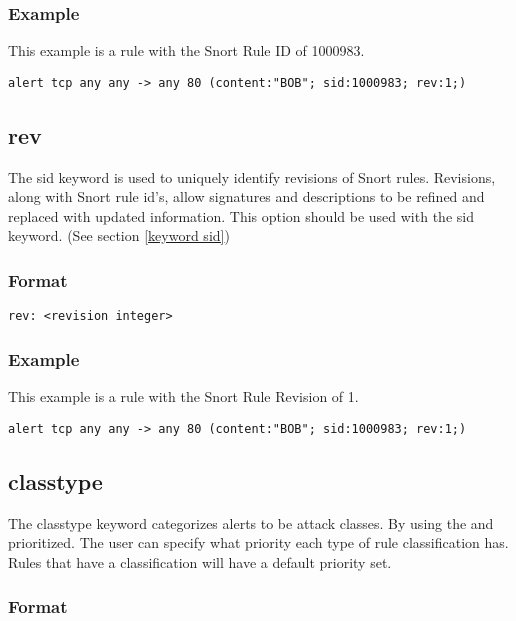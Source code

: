 \documentclass[english]{report}
\begin{document}
\subsubsection{Example}
This example is a rule with the Snort Rule ID of 1000983.
\begin{verbatim}
alert tcp any any -> any 80 (content:"BOB"; sid:1000983; rev:1;)
\end{verbatim}

\subsection{rev \label{keyword rev}}

The sid keyword is used to uniquely identify revisions of Snort rules.
Revisions, along with Snort rule id's, allow signatures and descriptions to be
refined and replaced with updated information.  This option should be used with
the sid keyword.  (See section \ref{keyword sid})

\subsubsection{Format}

\begin{verbatim}
rev: <revision integer>
\end{verbatim}

\subsubsection{Example}
This example is a rule with the Snort Rule Revision of 1.
\begin{verbatim}
alert tcp any any -> any 80 (content:"BOB"; sid:1000983; rev:1;)
\end{verbatim}

\subsection{classtype}

The classtype keyword categorizes alerts to be attack classes. By
using the and prioritized. The user can specify what priority each
type of rule classification has. Rules that have a classification
will have a default priority set. 

\subsubsection{Format}
\end{document}
